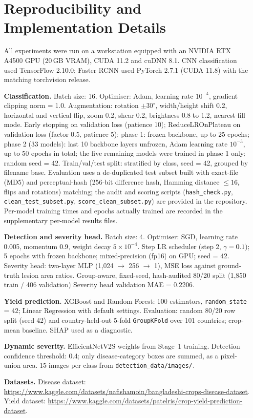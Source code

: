 \section{Reproducibility and Implementation Details}

All experiments were run on a workstation equipped with an
NVIDIA RTX A4500 GPU (20\,GB VRAM), CUDA 11.2 and cuDNN 8.1.
CNN classification used TensorFlow 2.10.0; Faster RCNN used
PyTorch 2.7.1 (CUDA 11.8) with the matching torchvision release.

\textbf{Classification.}
Batch size: 16. Optimiser: Adam, learning rate $10^{-4}$,
gradient clipping norm = 1.0.
Augmentation: rotation $\pm30^\circ$, width/height shift 0.2,
horizontal and vertical flip, zoom 0.2, shear 0.2,
brightness 0.8 to 1.2, nearest-fill mode.
Early stopping on validation loss (patience 10); ReduceLROnPlateau on
validation loss (factor 0.5, patience 5); phase 1: frozen backbone, up to
25 epochs; phase 2 (33 models): last 10 backbone layers unfrozen, Adam
learning rate $10^{-5}$, up to 50 epochs in total; the five remaining
models were trained in phase 1 only; random seed = 42.
Train/val/test split: stratified by class, seed = 42, grouped by filename base. Evaluation uses a de-duplicated test subset built with exact-file (MD5) and perceptual-hash (256-bit difference hash, Hamming distance $\le16$, flips and rotations) matching; the audit and scoring scripts (\texttt{hash\_check.py}, \texttt{clean\_test\_subset.py}, \texttt{score\_clean\_subset.py}) are provided in the repository.
Per-model training times and epochs actually trained are recorded in the
supplementary per-model results files.

\textbf{Detection and severity head.}
Batch size: 4. Optimiser: SGD, learning rate 0.005, momentum 0.9,
weight decay $5\!\times\!10^{-4}$.
Step LR scheduler (step 2, $\gamma = 0.1$); 5 epochs with frozen
backbone; mixed-precision (fp16) on GPU; seed = 42.
Severity head: two-layer MLP (1,024 $\to$ 256 $\to$ 1),
MSE loss against ground-truth lesion area ratios.
Group-aware, fixed-seed, hash-audited 80/20 split (1,850 train / 406 validation)
Severity head validation MAE = 0.2206.

\textbf{Yield prediction.}
XGBoost and Random Forest: 100 estimators, \texttt{random\_state} = 42;
Linear Regression with default settings. Evaluation: random 80/20 row
split (seed 42) and country-held-out 5-fold \texttt{GroupKFold} over 101
countries; crop-mean baseline. SHAP used as a diagnostic.

\textbf{Dynamic severity.}
EfficientNetV2S weights from Stage~1 training.
Detection confidence threshold: 0.4; only disease-category boxes are
summed, as a pixel-union area. 15 images per class from \texttt{detection\_data/images/}.

\textbf{Datasets.}
Disease dataset: \url{https://www.kaggle.com/datasets/nafishamoin/bangladeshi-crops-disease-dataset}.\\
Yield dataset: \url{https://www.kaggle.com/datasets/patelris/crop-yield-prediction-dataset}.

